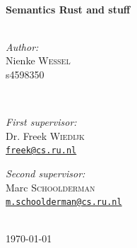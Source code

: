\documentclass{report}
\begin{document}
\begin{titlepage}
\HRule \\[0.4cm]
{ \huge \bfseries Semantics Rust and stuff}\\[0.4cm] %
\HRule \\[1.5cm]
 

\begin{minipage}[t]{0.4\textwidth}
\begin{flushleft} \large
\emph{Author:}\\
Nienke \textsc{Wessel}\\ %
s4598350
\end{flushleft}
\end{minipage}
~
\begin{minipage}[t]{0.4\textwidth}
\begin{flushright} \large
\emph{First supervisor:} \\
Dr. Freek \textsc{Wiedijk}\\ %
\texttt{\href{mailto:freek@cs.ru.nl}{freek@cs.ru.nl}}
\end{flushright}

\begin{flushright} \large
\emph{Second supervisor:} \\
Marc \textsc{Schoolderman} \\%
\texttt{\href{mailto:m.schoolderman@cs.ru.nl}{m.schoolderman@cs.ru.nl}}
\end{flushright}
\end{minipage}\\[2cm]



{\large \today}\\[2cm] %

\vfill %

\end{titlepage}
\end{document}
